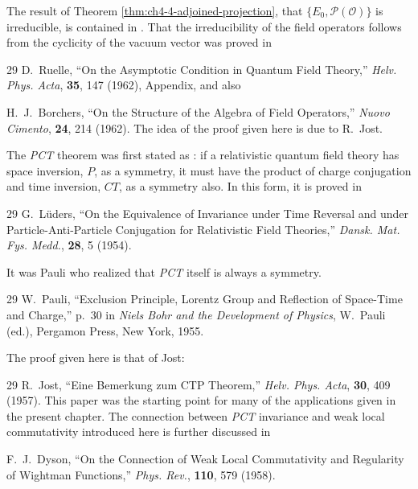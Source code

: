 The result of Theorem \ref{thm:ch4-4-adjoined-projection}, that \(\{E_0,\mathcal{P}(\mathcal{O})\}\) is
irreducible, is contained in \cite{ch4-3}. That the irreducibility of the field
operators follows from the cyclicity of the vacuum vector was proved in

\begin{thebibliography}{29}
\setcounter{NAT@ctr}{5}
 D.~Ruelle, ``On the Asymptotic Condition in Quantum Field Theory,''
\emph{Helv. Phys. Acta}, \textbf{35}, 147 (1962), Appendix, and also

 H.~J.~Borchers, ``On the Structure of the Algebra of Field
Operators,'' \emph{Nuovo Cimento}, \textbf{24}, 214 (1962). The idea of the
proof given here is due to R.~Jost.
\end{thebibliography}

The \emph{PCT} theorem was first stated as : if a relativistic quantum field
theory has space inversion, \(P\), as a symmetry, it must have the product of
charge conjugation and time inversion, \(CT\), as a symmetry also. In this
form, it is proved in

\begin{thebibliography}{29}
\setcounter{NAT@ctr}{7}
 G.~L\"uders, ``On the Equivalence of Invariance under Time Reversal
and under Particle-Anti-Particle Conjugation for Relativistic Field
Theories,'' \emph{Dansk. Mat. Fys. Medd.}, \textbf{28}, 5 (1954).
\end{thebibliography}

It was Pauli who realized that \emph{PCT} itself is always a symmetry.

\begin{thebibliography}{29}
\setcounter{NAT@ctr}{8}
 W.~Pauli, ``Exclusion Principle, Lorentz Group and Reflection of
Space-Time and Charge,'' p.~30 in \emph{Niels Bohr and the Development of
Physics}, W.~Pauli (ed.), Pergamon Press, New York, 1955.
\end{thebibliography}

The proof given here is that of Jost:

\begin{thebibliography}{29}
\setcounter{NAT@ctr}{9}
 R.~Jost, ``Eine Bemerkung zum CTP Theorem,'' \emph{Helv. Phys.
Acta}, \textbf{30}, 409 (1957). This paper was the starting point for many
of the applications given in the present chapter. The connection between
\emph{PCT} invariance and weak local commutativity introduced here is further
discussed in

 F.~J.~Dyson, ``On the Connection of Weak Local Commutativity and
Regularity of Wightman Functions,'' \emph{Phys. Rev.}, \textbf{110}, 579
(1958).
\end{thebibliography}

